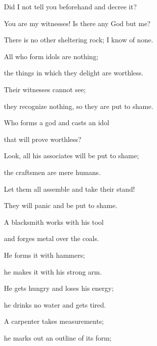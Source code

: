 {\par }{\Q Did I
not
tell
you beforehand
and decree it?
\par }{\Q You
are my witnesses! Is there
any God
but
me?
\par }{\Q There is no
other sheltering
rock;
I know of none.
\par }{\Q {}All
who form
idols
are nothing;
\par }{\Q the things in which they delight
are
worthless.
\par }{\Q Their witnesses
cannot
see;
\par }{\Q they
recognize
nothing, so
they are put to shame.
\par }{\Q {}Who
forms
a god
and casts
an idol
\par }{\Q that
will prove worthless?
\par }{\Q {}Look,
all
his associates
will be put to shame;
\par }{\Q the craftsmen
are mere humans.
\par }{\Q Let them all
assemble
and take their stand!
\par }{\Q They will panic
and be put to shame.
\par }{\Q {}A blacksmith
works
with his tool
\par }{\Q and forges metal over the coals.
\par }{\Q He forms
it with hammers;
\par }{\Q he makes
it with his strong
arm.
\par }{\Q He gets hungry
and loses
his energy;
\par }{\Q he drinks
no
water
and gets tired.
\par }{\Q {}A carpenter
takes
measurements;
\par }{\Q he marks out
an outline
of its form;

}
